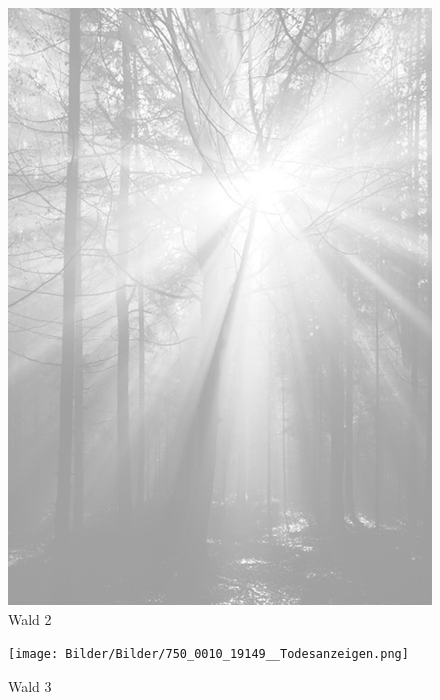 \documentclass[ngerman,a4paper,11pt]{scrreprt}
\begin{document}
\begin{figure}[H]
\centering
\includegraphics[width=\textwidth,height=.8\textheight]{Bilder/Bilder/750_0010_16157_1122849_Hintergrund_mit_Wald_und_Sonne_1.png}
\caption{Wald 2}
\end{figure}

\begin{figure}[H]
\centering
\texttt{[image: Bilder/Bilder/750\_0010\_19149\_\_Todesanzeigen.png]}
\caption{Wald 3}
\end{figure}
\end{document}
